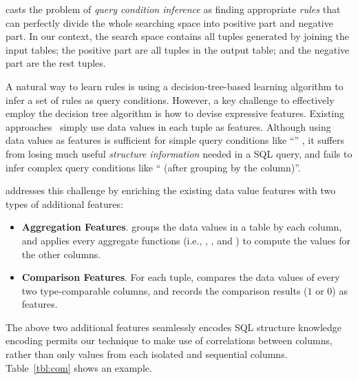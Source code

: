\ourtool casts the problem of \textit{query condition inference} as finding
appropriate \textit{rules} that can perfectly divide the whole searching space
into positive part and negative part. In our context, the search space
contains all tuples generated by joining the input tables; the positive part
are all tuples in the output table; and the negative part are the rest
tuples.

A natural way to learn rules is using a decision-tree-based
learning algorithm to infer a set of rules as query conditions. However,
a key challenge to effectively employ the decision tree algorithm is how to devise
expressive features. Existing approaches~\cite{Tran:2009} simply use
data values in each tuple as features. Although using data values as
features is sufficient for simple query conditions like
``'' , it suffers from losing much useful \textit{structure information}
needed in a SQL query, and fails to infer complex query conditions
like `` (after grouping by
the  column)''.


\ourtool addresses this challenge by enriching the existing data value features with
two types of additional features:

\begin{itemize}

\item {\textbf{Aggregation Features}}. \ourtool groups the data values
in a table by each column, and applies every aggregate functions (i.e.,
, ,  and )
to compute the values for the other columns. 
 


\item {\textbf{Comparison Features}}. For each tuple, \ourtool compares
the data values of every two type-comparable columns, and records
the comparison results ($1$ or $0$) as features.


\end{itemize}

The above two additional features seamlessly encodes SQL
structure
 knowledge encoding permits our technique
to make use of correlations between columns, rather than only values
from each isolated and sequential columns.
Table~\ref{tbl:com} shows an example.


